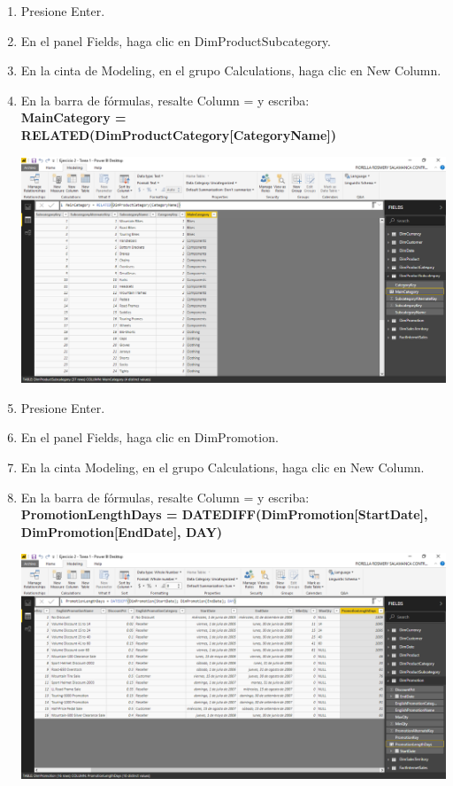 \begin{enumerate}[1.]
    \item Presione Enter.
    \item En el panel Fields, haga clic en DimProductSubcategory.
    \item En la cinta de Modeling, en el grupo Calculations, haga clic en New Column.
    \item En la barra de fórmulas, resalte Column = y escriba: \\

\textbf{MainCategory = RELATED(DimProductCategory[CategoryName])}\\

	\begin{center}
	\includegraphics[width=17cm]{./Imagenes/Ejercicio2-Tarea1/6}
	\end{center}	

    \item Presione Enter.
    \item En el panel Fields, haga clic en DimPromotion.
    \item En la cinta Modeling, en el grupo Calculations, haga clic en New Column.
    \item En la barra de fórmulas, resalte Column = y escriba: \\

\textbf{PromotionLengthDays = DATEDIFF(DimPromotion[StartDate],\\
DimPromotion[EndDate], DAY)}\\

	\begin{center}
	\includegraphics[width=17cm]{./Imagenes/Ejercicio2-Tarea1/7}
	\end{center}	


\end{enumerate}
